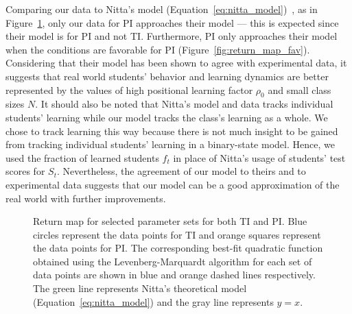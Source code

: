 \documentclass[twocolumn,secnumarabic,amssymb, nobibnotes, aps, prd]{revtex4-2}
\begin{document}
        Comparing our data to Nitta's model (Equation~\ref{eq:nitta_model})~\cite{nitta2019mathematical}, as in Figure~\ref{fig:Return map}, only our data for PI approaches their model --- this is expected since their model is for PI and not TI.
        Furthermore, PI only approaches their model when the conditions are favorable for PI (Figure~\ref{fig:return_map_fav}).
        Considering that their model has been shown to agree with experimental data, it suggests that real world students' behavior and learning dynamics are better represented by the values of high positional learning factor $\rho_0$ and small class sizes $N$.
        It should also be noted that Nitta's model and data tracks individual students' learning while our model tracks the class's learning as a whole.
        We chose to track learning this way because there is not much insight to be gained from tracking individual students' learning in a binary-state model.
        Hence, we used the fraction of learned students $f_t$ in place of Nitta's usage of students' test scores for $S_t$.
        Nevertheless, the agreement of our model to theirs and to experimental data suggests that our model can be a good approximation of the real world with further improvements.

        \begin{figure}[htbp!]
            \centering
            \caption{Return map for selected parameter sets for both TI and PI.
            Blue circles represent the data points for TI and orange squares represent the data points for PI.
            The corresponding best-fit quadratic function obtained using the Levenberg-Marquardt algorithm for each set of data points are shown in blue and orange dashed lines respectively.
            The green line represents Nitta's theoretical model (Equation~\ref{eq:nitta_model}) and the gray line represents $y=x$.}
            \label{fig:Return map}
        \end{figure}
\end{document}
